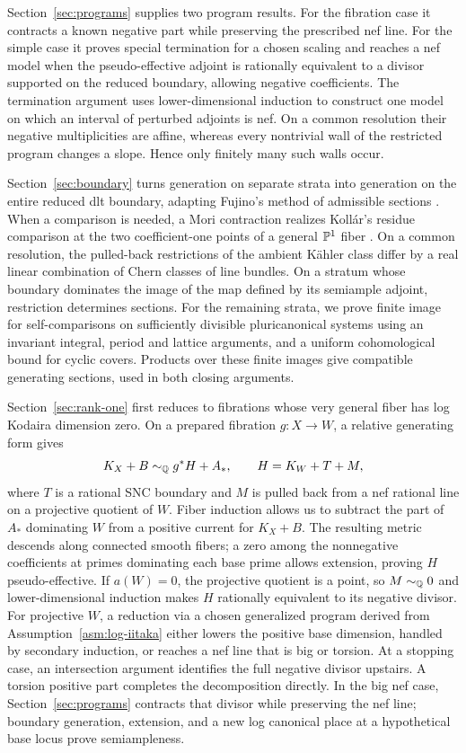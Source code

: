 Section~\ref{sec:programs} supplies two program results. For the fibration
case it contracts a known negative part while preserving the prescribed nef
line. For the simple case it proves special termination for a chosen scaling
and reaches a nef model when the pseudo-effective adjoint is rationally
equivalent to a divisor supported on the reduced boundary, allowing negative
coefficients. The termination argument uses lower-dimensional induction to
construct one model on which an interval of perturbed adjoints is nef. On a
common resolution their negative multiplicities are affine, whereas every
nontrivial wall of the restricted program changes a slope. Hence only
finitely many such walls occur.

Section~\ref{sec:boundary} turns generation on separate strata into generation
on the entire reduced dlt boundary, adapting Fujino's method of admissible
sections \cite[Section~4]{Fujino2000}. When a comparison is needed, a Mori
contraction realizes Kollár's residue comparison at the two coefficient-one
points of a general \(\mathbb P^1\) fiber
\cite[Definition~13 and Proposition~14]{Kollar2013Sources}. On a common
resolution, the pulled-back restrictions of the ambient Kähler class differ
by a real linear combination of Chern classes of line bundles. On a stratum
whose boundary dominates the image of the map
defined by its semiample adjoint, restriction determines sections. For the
remaining strata, we prove finite image for self-comparisons on sufficiently
divisible pluricanonical systems using an invariant integral, period and
lattice arguments, and a uniform cohomological bound for cyclic covers.
Products over these finite images give compatible generating sections, used
in both closing arguments.

Section~\ref{sec:rank-one} first reduces to fibrations whose very general
fiber has log Kodaira dimension zero. On a prepared fibration \(g:X\to W\),
a relative generating form gives
\[
 K_X+B\sim_{\mathbb Q}g^*H+A_*,\qquad H=K_W+T+M,
\]
where \(T\) is a rational SNC boundary and \(M\) is pulled back from a nef
rational line on a projective quotient of \(W\). Fiber induction allows us
to subtract the part of \(A_*\) dominating \(W\) from a positive current for
\(K_X+B\). The resulting metric descends along connected smooth fibers; a
zero among the nonnegative coefficients at primes dominating each base prime
allows extension, proving \(H\) pseudo-effective. If \(a(W)=0\), the
projective quotient is a point, so \(M\sim_{\mathbb Q}0\) and lower-dimensional
induction makes \(H\) rationally equivalent to its negative divisor. For
projective \(W\), a reduction via a chosen generalized program derived from
Assumption~\ref{asm:log-iitaka} either lowers the positive base dimension,
handled by secondary induction, or reaches a nef line that is big or torsion.
At a stopping case, an intersection argument identifies the full negative
divisor upstairs. A torsion positive part completes the decomposition
directly. In the big nef case, Section~\ref{sec:programs} contracts that
divisor while preserving the nef line; boundary generation, extension, and
a new log canonical place at a hypothetical base locus prove semiampleness.

